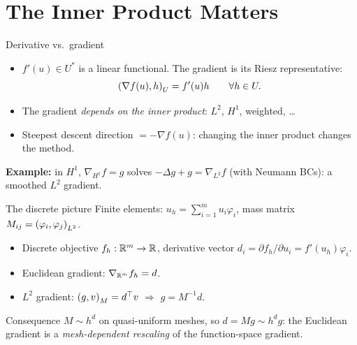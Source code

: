 \documentclass[main.tex]{subfiles}
\begin{document}
\section{The Inner Product Matters}

\begin{frame}{Derivative vs.\ gradient}
  \begin{itemize}
    \item $f'(u) \in U^*$ is a linear functional. The \alert{gradient} is its Riesz representative:
      \[
        \left( \nabla f(u), h \right)_U = f'(u)h \qquad \forall h \in U .
      \]
    \item The gradient \emph{depends on the inner product}: $L^2$, $H^1$, weighted, \dots
    \item Steepest descent direction $= -\nabla f(u)$: changing the inner product changes the method.
  \end{itemize}
  \vspace{1ex}
  \textbf{Example:} in $H^1$, $\nabla_{H^1} f = g$ solves $-\Delta g + g = \nabla_{L^2} f$ (with Neumann BCs): a smoothed $L^2$ gradient.
\end{frame}

\begin{frame}{The discrete picture}
  Finite elements: $u_h = \sum_{i=1}^m u_i\varphi_i$, \; mass matrix $M_{ij} = \left( \varphi_i, \varphi_j \right)_{L^2}$.
  \begin{itemize}
    \item Discrete objective $f_h: \mathbb{R}^m \to \mathbb{R}$, derivative vector $d_i = \partial f_h/\partial u_i = f'(u_h)\varphi_i$.
    \item Euclidean gradient: $\nabla_{\mathbb{R}^m} f_h = d$.
    \item $L^2$ gradient: $\left( g, v \right)_M = d^\top v$ \; $\Rightarrow$ \; $g = M^{-1}d$.
  \end{itemize}
  \vspace{1ex}
  \begin{alertblock}{Consequence}
    $M \sim h^{d}$ on quasi-uniform meshes, so $d = Mg \sim h^{d}g$: the Euclidean gradient is a \emph{mesh-dependent rescaling} of the function-space gradient.
  \end{alertblock}
\end{frame}
\end{document}
